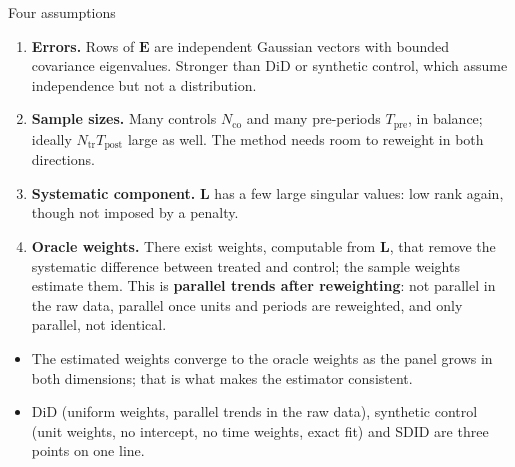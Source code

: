 \documentclass[
  11pt,
  ignorenonframetext,
  aspectratio=169,
]{beamer}
\providecommand{\tightlist}{%
  \setlength{\itemsep}{0pt}\setlength{\parskip}{0pt}}
\begin{document}
\begin{frame}{Four assumptions}
\protect{}\label{four-assumptions}
\begin{enumerate}
\tightlist
\item
  \textbf{Errors.} Rows of \(\mathbf E\) are independent Gaussian
  vectors with bounded covariance eigenvalues. Stronger than DiD or
  synthetic control, which assume independence but not a distribution.
\item
  \textbf{Sample sizes.} Many controls \(N_{\text{co}}\) and many
  pre-periods \(T_{\text{pre}}\), in balance; ideally
  \(N_{\text{tr}} T_{\text{post}}\) large as well. The method needs room
  to reweight in both directions.
\item
  \textbf{Systematic component.} \(\mathbf L\) has a few large singular
  values: low rank again, though not imposed by a penalty.
\item
  \textbf{Oracle weights.} There exist weights, computable from
  \(\mathbf L\), that remove the systematic difference between treated
  and control; the sample weights estimate them. This is
  \textbf{parallel trends after reweighting}: not parallel in the raw
  data, parallel once units and periods are reweighted, and only
  parallel, not identical.
\end{enumerate}

\vspace{0.4em}

\begin{itemize}
\tightlist
\item
  The estimated weights converge to the oracle weights as the panel
  grows in both dimensions; that is what makes the estimator consistent.
\item
  DiD (uniform weights, parallel trends in the raw data), synthetic
  control (unit weights, no intercept, no time weights, exact fit) and
  SDID are three points on one line.
\end{itemize}
\end{frame}
\end{document}
